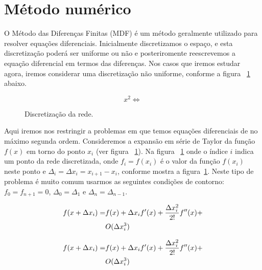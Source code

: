 \documentclass[10pt,a4paper,twocolumn,showkeys,showpacs,aps,groupedaddress,noeprint]{revtex4-1}
\begin{document}
\section{Método numérico}

O Método das Diferenças Finitas (MDF) é um método geralmente
utilizado para resolver equações diferenciais. Inicialmente
discretizamos o espaço, e esta discretização poderá ser
uniforme ou não e posteriromente reescrevemos a equação\cite[ver pag. 34]{RLandau97}
diferencial em termos das diferenças. Nos casos que iremos estudar
agora, iremos considerar uma discretização não uniforme,
conforme a figura ~\ref{fig2} abaixo.

\begin{equation}
   x^2\Longleftrightarrow
\end{equation} 

\begin{figure}[htb]
\begin{center}

\end{center}
\vspace{-0.2cm}
\caption{Discretiza\c{c}\~{a}o da rede. \protect\lipsum[4] \label{fig2}}
\end{figure}%


Aqui iremos nos restringir a problemas em que temos equações
diferenciais de no máximo segunda ordem. Consideremos a expansão em 
série de Taylor da função $f(x)$ em torno do ponto $x_{i}$ (ver
figura ~\ref{fig2}). Na figura ~\ref{fig2} onde o índice $i$ indica um
ponto da rede discretizada, onde $f_{i}=f(x_{i})$ é o valor da 
função $f(x_{i})$ neste ponto e $\Delta _{i}=\Delta x_{i}=x_{i+1}-x_{i}$,
conforme mostra a figura~\ref{fig2}. Neste tipo de problema é muito
comum usarmos as seguintes condições de contorno: $f_{0}=f_{n+1}=0$,
$\Delta _{0}=\Delta _{1}$ e $\Delta _{n}=\Delta _{n-1}$.

\begin{align}
f(x+\Delta x_{i}) = & f(x) +\Delta x_{i}f^{\prime }(x) 
+\dfrac{\Delta x_{i}^{2}}{2!}f^{\prime \prime }(x) + \notag \\
& O(\Delta x_{i}^{3}) \label{df0}
\end{align}

\begin{align}
f(x+\Delta x_{i}) = & f(x)+\Delta x_{i}f^{\prime }(x)+
\dfrac{\Delta x_{i}^{2}}{2!}f^{\prime \prime }(x) + \notag \\ 
& O(\Delta x_{i}^{3})  \label{df1}
\end{align}
\end{document}
